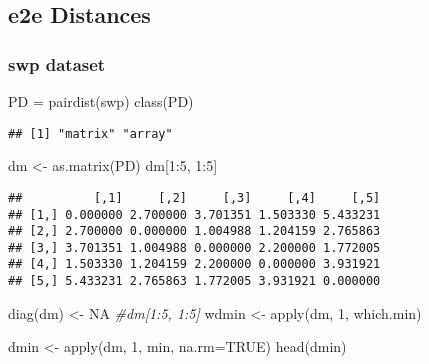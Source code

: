 \documentclass[
]{book}
\newenvironment{Shaded}{\begin{snugshade}}{\end{snugshade}}
\newcommand{\AttributeTok}[1]{\textcolor[rgb]{0.77,0.63,0.00}{#1}}
\newcommand{\CommentTok}[1]{\textcolor[rgb]{0.56,0.35,0.01}{\textit{#1}}}
\newcommand{\ConstantTok}[1]{\textcolor[rgb]{0.00,0.00,0.00}{#1}}
\newcommand{\DecValTok}[1]{\textcolor[rgb]{0.00,0.00,0.81}{#1}}
\newcommand{\FunctionTok}[1]{\textcolor[rgb]{0.00,0.00,0.00}{#1}}
\newcommand{\NormalTok}[1]{#1}
\newcommand{\OtherTok}[1]{\textcolor[rgb]{0.56,0.35,0.01}{#1}}
\newcommand{\SpecialCharTok}[1]{\textcolor[rgb]{0.00,0.00,0.00}{#1}}
\begin{document}
\hypertarget{e2e-distances}{%
\subsection{e2e Distances}\label{e2e-distances}}

\hypertarget{swp-dataset-1}{%
\subsubsection{swp dataset}\label{swp-dataset-1}}

\begin{Shaded}
\begin{Highlighting}[]
\NormalTok{PD }\OtherTok{=} \FunctionTok{pairdist}\NormalTok{(swp)}
\FunctionTok{class}\NormalTok{(PD)}
\end{Highlighting}
\end{Shaded}

\begin{verbatim}
## [1] "matrix" "array"
\end{verbatim}

\begin{Shaded}
\begin{Highlighting}[]
\NormalTok{dm }\OtherTok{\textless{}{-}} \FunctionTok{as.matrix}\NormalTok{(PD)}
\NormalTok{dm[}\DecValTok{1}\SpecialCharTok{:}\DecValTok{5}\NormalTok{, }\DecValTok{1}\SpecialCharTok{:}\DecValTok{5}\NormalTok{]}
\end{Highlighting}
\end{Shaded}

\begin{verbatim}
##          [,1]     [,2]     [,3]     [,4]     [,5]
## [1,] 0.000000 2.700000 3.701351 1.503330 5.433231
## [2,] 2.700000 0.000000 1.004988 1.204159 2.765863
## [3,] 3.701351 1.004988 0.000000 2.200000 1.772005
## [4,] 1.503330 1.204159 2.200000 0.000000 3.931921
## [5,] 5.433231 2.765863 1.772005 3.931921 0.000000
\end{verbatim}

\begin{Shaded}
\begin{Highlighting}[]
\FunctionTok{diag}\NormalTok{(dm) }\OtherTok{\textless{}{-}} \ConstantTok{NA}
\CommentTok{\#dm[1:5, 1:5]}
\NormalTok{wdmin }\OtherTok{\textless{}{-}} \FunctionTok{apply}\NormalTok{(dm, }\DecValTok{1}\NormalTok{, which.min)}

\NormalTok{dmin }\OtherTok{\textless{}{-}} \FunctionTok{apply}\NormalTok{(dm, }\DecValTok{1}\NormalTok{, min, }\AttributeTok{na.rm=}\ConstantTok{TRUE}\NormalTok{)}
\FunctionTok{head}\NormalTok{(dmin)}
\end{Highlighting}
\end{Shaded}
\end{document}

